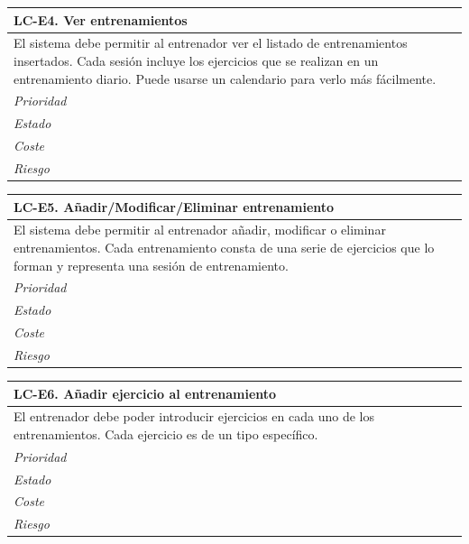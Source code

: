 	\begin{center}
		\begin{tabularx}{15cm}{|X|}
			\hline 
				\bf{LC-E4. Ver entrenamientos}\\
			\hline
				El sistema debe permitir al entrenador ver el listado de entrenamientos insertados. Cada sesión incluye los ejercicios que se realizan en un entrenamiento diario. Puede usarse un calendario para verlo más fácilmente.\\
			\hline
				\it{Prioridad}\\
			\hline
				\it{Estado}\\
			\hline
				\it{Coste}\\
			\hline
				\it{Riesgo}\\
			\hline
		\end{tabularx}
	\end{center}
	
	\begin{center}
		\begin{tabularx}{15cm}{|X|}
			\hline 
				\bf{LC-E5. Añadir/Modificar/Eliminar entrenamiento}\\
			\hline
				El sistema debe permitir al entrenador añadir, modificar o eliminar entrenamientos. Cada entrenamiento consta de una serie de ejercicios que lo forman y representa una sesión de entrenamiento.\\
			\hline
				\it{Prioridad}\\
			\hline
				\it{Estado}\\
			\hline
				\it{Coste}\\
			\hline
				\it{Riesgo}\\
			\hline
		\end{tabularx}
	\end{center}
	
	\begin{center}
		\begin{tabularx}{15cm}{|X|}
			\hline 
				\bf{LC-E6. Añadir ejercicio al entrenamiento}\\
			\hline
				El entrenador debe poder introducir ejercicios en cada uno de los entrenamientos. Cada ejercicio es de un tipo específico.\\
			\hline
				\it{Prioridad}\\
			\hline
				\it{Estado}\\
			\hline
				\it{Coste}\\
			\hline
				\it{Riesgo}\\
			\hline
		\end{tabularx}
	\end{center}
	
